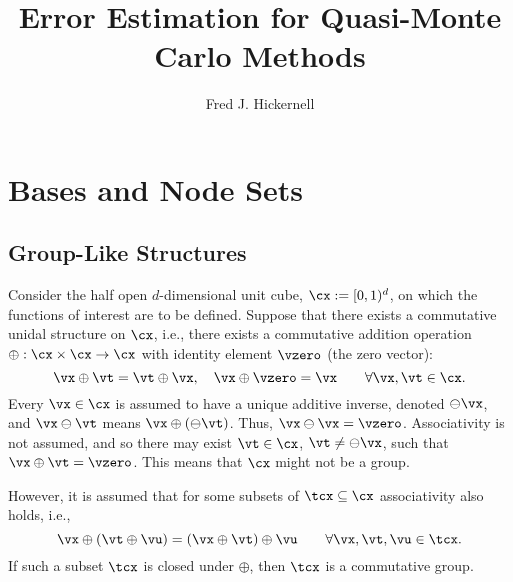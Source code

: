\documentclass[]{elsarticle}
\theoremstyle{definition}
\begin{document}
\begin{frontmatter}

\title{Error Estimation for Quasi-Monte Carlo Methods}
\author{Fred J. Hickernell}
\address{Room E1-208, Department of Applied Mathematics, Illinois Institute of Technology,\\ 10 W.\ 32$^{\text{nd}}$ St., Chicago, IL 60616}
\begin{abstract} 
\end{abstract}

\begin{keyword}


\end{keyword}
\end{frontmatter}

\section{Bases and Node Sets}

\subsection{Group-Like Structures}
Consider the half open $d$-dimensional unit cube, $\cx:=[0,1)^d$, on which the functions of interest are to be defined. Suppose that there exists a commutative unidal structure on $\cx$, i.e., there exists a commutative addition operation $\oplus:\cx \times \cx \to \cx$ with identity element $\vzero$ (the zero vector): 
\[
\vx \oplus \vt = \vt \oplus \vx, \quad \vx \oplus \vzero =\vx \qquad \forall \vx,\vt \in \cx.
\]
Every $\vx \in \cx$ is assumed to have a unique additive inverse,  denoted $\ominus \vx$, and $\vx \ominus \vt$ means $\vx \oplus (\ominus \vt)$.  Thus, $\vx \ominus \vx = \vzero$.  Associativity is not assumed, and so there may exist $\vt \in \cx$, $\vt \ne \ominus \vx$, such that $\vx \oplus \vt = \vzero$.  This means that $\cx$ might not be a group.  

However, it is assumed that for some subsets of $\tcx \subseteq \cx$ associativity also holds, i.e., 
\begin{equation} \label{assocprop}
\vx \oplus (\vt \oplus \vu) = (\vx \oplus \vt) \oplus \vu \qquad \forall \vx,\vt,\vu \in \tcx.
\end{equation}
If such a subset $\tcx$ is closed under $\oplus$, then $\tcx$ is a commutative group.
\end{document}
